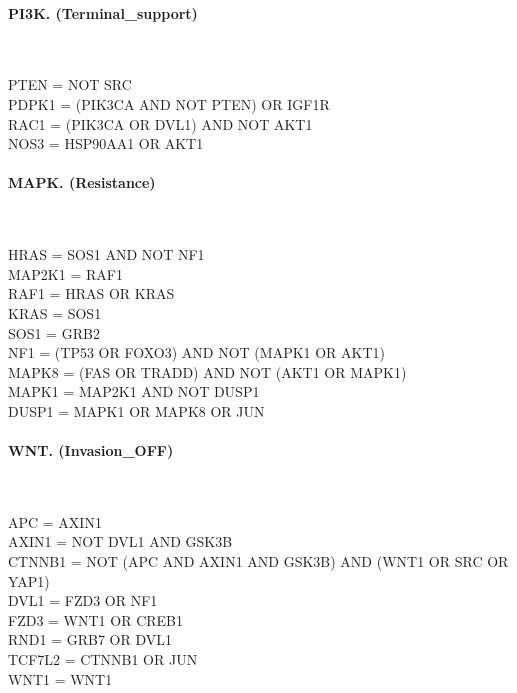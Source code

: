 \paragraph{PI3K. (Terminal\_support)}\mbox{}\\
\begin{flushleft}\ttfamily\small
PTEN = NOT SRC\\
PDPK1 = (PIK3CA AND NOT PTEN) OR IGF1R\\
RAC1 = (PIK3CA OR DVL1) AND NOT AKT1\\
NOS3 = HSP90AA1 OR AKT1\\
\end{flushleft}

\paragraph{MAPK. (Resistance)}\mbox{}\\
\begin{flushleft}\ttfamily\small
HRAS = SOS1 AND NOT NF1\\
MAP2K1 = RAF1\\
RAF1 = HRAS OR KRAS\\
KRAS = SOS1\\
SOS1 = GRB2\\
NF1 = (TP53 OR FOXO3) AND NOT (MAPK1 OR AKT1)\\
MAPK8 = (FAS OR TRADD) AND NOT (AKT1 OR MAPK1)\\
MAPK1 = MAP2K1 AND NOT DUSP1\\
DUSP1 = MAPK1 OR MAPK8 OR JUN\\
\end{flushleft}

\paragraph{WNT. (Invasion\_OFF)}\mbox{}\\
\begin{flushleft}\ttfamily\small
APC = AXIN1\\
AXIN1 = NOT DVL1 AND GSK3B\\
CTNNB1 = NOT (APC AND AXIN1 AND GSK3B) AND (WNT1 OR SRC OR YAP1)\\
DVL1 = FZD3 OR NF1\\
FZD3 = WNT1 OR CREB1\\
RND1 = GRB7 OR DVL1\\
TCF7L2 = CTNNB1 OR JUN\\
WNT1 = WNT1\\
\end{flushleft}

